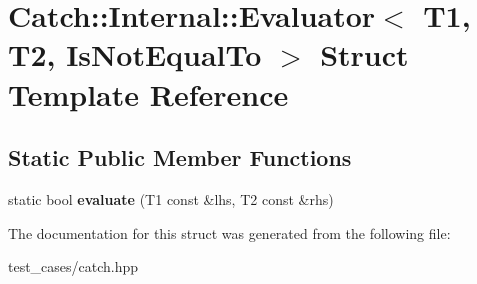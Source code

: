 \hypertarget{structCatch_1_1Internal_1_1Evaluator_3_01T1_00_01T2_00_01IsNotEqualTo_01_4}{}\section{Catch\+:\+:Internal\+:\+:Evaluator$<$ T1, T2, Is\+Not\+Equal\+To $>$ Struct Template Reference}
\label{structCatch_1_1Internal_1_1Evaluator_3_01T1_00_01T2_00_01IsNotEqualTo_01_4}
\subsection*{Static Public Member Functions}
\begin{DoxyCompactItemize}
\item 
\mbox{\label{structCatch_1_1Internal_1_1Evaluator_3_01T1_00_01T2_00_01IsNotEqualTo_01_4_a956a12d0f4a7dceb5a1ce914421ff945}} 
static bool {\bfseries evaluate} (T1 const \&lhs, T2 const \&rhs)
\end{DoxyCompactItemize}


The documentation for this struct was generated from the following file\+:\begin{DoxyCompactItemize}
\item 
test\+\_\+cases/catch.\+hpp\end{DoxyCompactItemize}
